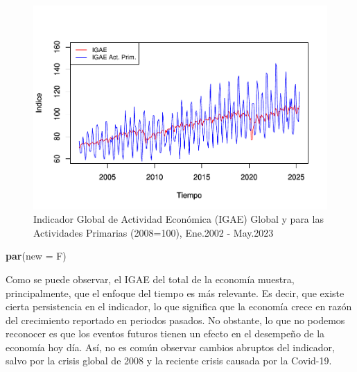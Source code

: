\documentclass[
]{book}
\newenvironment{Shaded}{\begin{snugshade}}{\end{snugshade}}
\newcommand{\AttributeTok}[1]{\textcolor[rgb]{0.13,0.29,0.53}{#1}}
\newcommand{\FunctionTok}[1]{\textcolor[rgb]{0.13,0.29,0.53}{\textbf{#1}}}
\newcommand{\NormalTok}[1]{#1}
\begin{document}
\begin{figure}

{\centering \includegraphics{Notas-Series-Tiempo_files/figure-latex/fig1-1} 

}

\caption{Indicador Global de Actividad Económica (IGAE) Global y para las Actividades Primarias (2008=100), Ene.2002 - May.2023}\label{fig:fig1}
\end{figure}

\begin{Shaded}
\begin{Highlighting}[]
\FunctionTok{par}\NormalTok{(}\AttributeTok{new =}\NormalTok{ F)}
\end{Highlighting}
\end{Shaded}

Como se puede observar, el IGAE del total de la economía muestra, principalmente, que el enfoque del tiempo es más relevante. Es decir, que existe cierta persistencia en el indicador, lo que significa que la economía crece en razón del crecimiento reportado en periodos pasados. No obstante, lo que no podemos reconocer es que los eventos futuros tienen un efecto en el desempeño de la economía hoy día. Así, no es común observar cambios abruptos del indicador, salvo por la crisis global de 2008 y la reciente crisis causada por la Covid-19.
\end{document}
